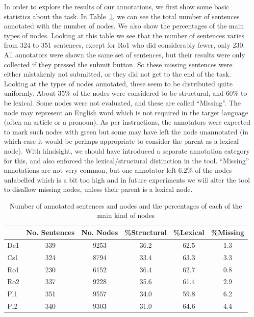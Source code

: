 \documentclass[11pt]{article}
\begin{document}
In order to explore the results of our annotations, we first show some basic statistics
about the task. In Table~\ref{tab:stat-all}, we can see the total number of sentences annotated
%
with
the number of nodes. We also show the percentages of the main types of nodes.
Looking at this table we see that the number of sentences varies from 324 to 351 sentences,
except for Ro1 who did considerably fewer, only 230. 
All annotators were shown the same set of sentences, but their results were only
collected if they pressed the submit button. So these missing sentences were either mistakenly
not submitted, or they did not get to the end of the task. 
Looking at the types of nodes annotated, these seem to be distributed quite uniformly.
About 35\% of the nodes were considered to be structural, and 60\% to be lexical.
Some nodes were not evaluated, and these are called ``Missing''. 
The node may represent an English
word which is not required in the target language (often an article or a
pronoun).
As per instructions, the annotators were expected to mark such nodes with green
but some may have left the node unannotated (in which case it would be perhaps
appropriate to consider the parent as a lexical node).
With hindsight, we should have introduced a separate annotation category for this, and
also enforced the lexical/structural distinction in the tool. ``Missing''
annotations are not very common, but
one annotator left 6.2\% of the nodes unlabelled which is a bit too high and in 
future experiments we will alter the tool to disallow missing nodes, unless their parent is a lexical node. 

\begin{table}[h!]
\begin{center}
      \begin{tabular}{|l|c|c|c|c|c|}
      \hline
 & \bf{No. Sentences} & \bf{No. Nodes} & \bf{\%Structural} & \bf{\%Lexical}  & \bf{\%Missing} \\
\hline                               
    De1  &  339 &  9253 & 36.2 & 62.5 & 1.3 \\ 
    Cs1  & 324 &  8794 & 33.4 & 63.3 & 3.3\\ 
    Ro1  & 230 &  6152 & 36.4 & 62.7 & 0.8\\ 
    Ro2  & 337 &  9228 & 35.6 & 61.4 & 2.9 \\ 
    Pl1  & 351 &  9557 & 34.0 & 59.8 & 6.2 \\ 
    Pl2  & 340 &  9303 & 31.0 & 64.6 & 4.4 \\ 
      \hline
    \end{tabular}
\end{center}
\normalsize
\vspace*{-3ex}
\caption{Number of annotated sentences and nodes and the percentages of each of the main kind of nodes
}
\label{tab:stat-all}
\end{table}
\end{document}
